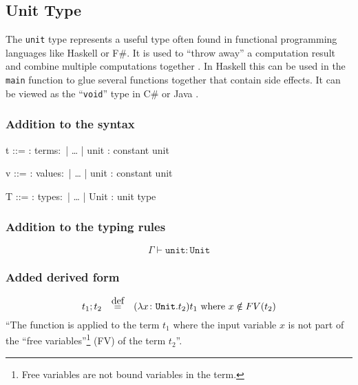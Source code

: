 \subsection{Unit Type}

The \texttt{unit} type represents a useful type often found in functional
programming languages like Haskell or F\#. It is used to ``throw away'' a
computation result and combine multiple computations together \cite{pierce2002ProgLang}.
In Haskell this can be used in the \texttt{main} function to glue
several functions together that contain side effects. It can be viewed as
the ``\texttt{void}'' type in C\# or Java \cite{pierce2002ProgLang}.

\subsubsection{Addition to the syntax \cite{pierce2002ProgLang}}
\begin{bnfgrammar}
    t ::= : terms$\colon$
    | \dots
    | unit : constant unit
\end{bnfgrammar}\leavevmode\newline

\begin{bnfgrammar}
    v ::= : values$\colon$
    | \dots
    | unit : constant unit
\end{bnfgrammar}\leavevmode\newline

\begin{bnfgrammar}
    T ::= : types$\colon$
    | \dots
    | Unit : unit type
\end{bnfgrammar}\leavevmode\newline

\subsubsection{Addition to the typing rules \cite{pierce2002ProgLang}}
\begin{equation*}
    \tag{Unit}
    \Gamma \vdash \texttt{unit} \colon \texttt{Unit}
\end{equation*}\leavevmode\newline

\subsubsection{Added derived form \cite{pierce2002ProgLang}}
\begin{equation*}
    t_1 ; t_2 \quad \defeq \quad (\lambda x \colon \texttt{Unit} . t_2) t_1 \text{ where } x \notin FV(t_2)
\end{equation*}
``The function is applied to the term $t_1$ where the input variable $x$ is not
part of the ``free variables''\footnote{Free variables are not bound variables in the term.}
(FV) of the term $t_2$''.

